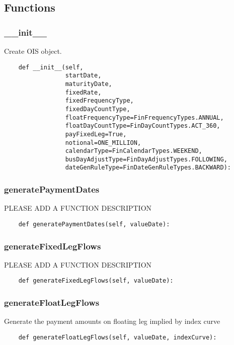 \documentclass[twoside,11pt]{book}
\begin{document}
\subsection*{Functions}

\subsubsection*{{\bf \_\_init\_\_}}
Create OIS object.  

\begin{lstlisting}
    def __init__(self,
                 startDate,
                 maturityDate,
                 fixedRate,
                 fixedFrequencyType,
                 fixedDayCountType,
                 floatFrequencyType=FinFrequencyTypes.ANNUAL,
                 floatDayCountType=FinDayCountTypes.ACT_360,
                 payFixedLeg=True,
                 notional=ONE_MILLION,
                 calendarType=FinCalendarTypes.WEEKEND,
                 busDayAdjustType=FinDayAdjustTypes.FOLLOWING,
                 dateGenRuleType=FinDateGenRuleTypes.BACKWARD):
\end{lstlisting}

\subsubsection*{{\bf generatePaymentDates}}
PLEASE ADD A FUNCTION DESCRIPTION

\begin{lstlisting}
    def generatePaymentDates(self, valueDate):
\end{lstlisting}

\subsubsection*{{\bf generateFixedLegFlows}}
PLEASE ADD A FUNCTION DESCRIPTION

\begin{lstlisting}
    def generateFixedLegFlows(self, valueDate):
\end{lstlisting}

\subsubsection*{{\bf generateFloatLegFlows}}
Generate the payment amounts on floating leg implied by index curve  

\begin{lstlisting}
    def generateFloatLegFlows(self, valueDate, indexCurve):
\end{lstlisting}
\end{document}
